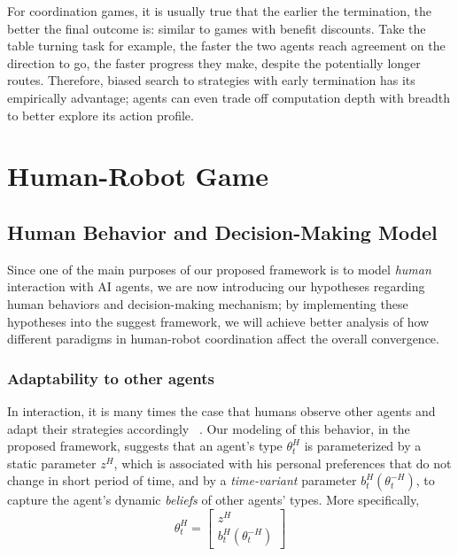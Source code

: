 \documentclass[letterpaper, 10 pt, conference]{ieeeconf}  %
\begin{document}
For coordination games, it is usually true that the earlier the termination, the better the final outcome is: similar to games with benefit discounts. Take the table turning task for example, the faster the two agents reach agreement on the direction to go, the faster progress they make, despite the potentially longer routes. Therefore, biased search to strategies with early termination has its empirically advantage; agents can even trade off computation depth with breadth to better explore its action profile. 

\section{Human-Robot Game}
\subsection{Human Behavior and Decision-Making Model}\label{sec:human_behavior}
Since one of the main purposes of our proposed framework is to model \textit{human} interaction with AI agents, we are now introducing our hypotheses regarding human behaviors and decision-making mechanism; by implementing these hypotheses into the suggest framework, we will achieve better analysis of how different paradigms in human-robot coordination affect the overall convergence.

\vspace{-.2em}
\subsubsection{Adaptability to other agents}\label{sec:adaptability}
\vspace{-.2em}
In interaction, it is many times the case that humans observe other agents and adapt their strategies accordingly ~\cite{nikolaidis2016formalizing,yang2017evaluating}. Our modeling of this behavior, in the proposed framework, suggests that an agent's type $\theta^H_t$ is parameterized by a static parameter $z^H$, which is associated with his personal preferences that do not change in short period of time, and by a \textit{time-variant} parameter $b^H_t(\theta^{-H}_t)$, to capture the agent's dynamic \textit{beliefs} of other agents' types. More specifically,
\begin{equation}
  \theta^H_t = \begin{bmatrix}
    z^H \\
    b^H_t(\theta^{-H}_t)
  \end{bmatrix}
\end{equation}
\end{document}

